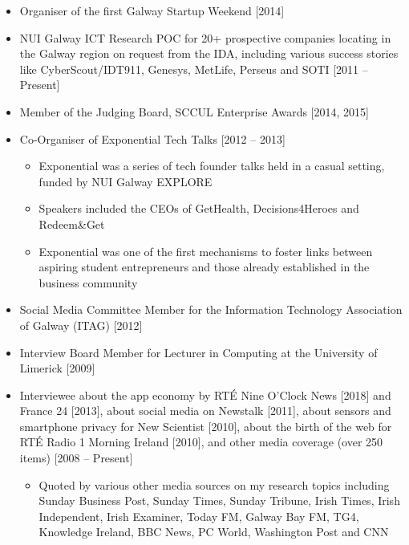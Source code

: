 \documentclass[10pt,a4paper]{res} %
\begin{document}
\begin{resume}
\begin{itemize}
\item Organiser of the first Galway Startup Weekend [2014]
\item NUI Galway ICT Research POC for 20+ prospective companies locating in the Galway region on request from the IDA, including various success stories like CyberScout/IDT911, Genesys, MetLife, Perseus and SOTI [2011 -- Present]
\item Member of the Judging Board, SCCUL Enterprise Awards [2014, 2015]
\item Co-Organiser of Exponential Tech Talks [2012 -- 2013]
\begin{itemize} \itemsep -2pt
\item Exponential was a series of tech founder talks held in a casual setting, funded by NUI Galway EXPLORE
\item Speakers included the CEOs of GetHealth, Decisions4Heroes and Redeem\&Get
\item Exponential was one of the first mechanisms to foster links between aspiring student entrepreneurs and those already established in the business community
\end{itemize}
\item Social Media Committee Member for the Information Technology Association of Galway (ITAG) [2012]
\item Interview Board Member for Lecturer in Computing at the University of Limerick [2009]
\item Interviewee about the app economy by RT\'{E} Nine O'Clock News [2018] and France 24 [2013], about social media on Newstalk [2011], about sensors and smartphone privacy for New Scientist [2010], about the birth of the web for RT\'{E} Radio 1 Morning Ireland [2010], and other media coverage (over 250 items) [2008 -- Present]
\begin{itemize} \itemsep -2pt
\item Quoted by various other media sources on my research topics including Sunday Business Post, Sunday Times, Sunday Tribune, Irish Times, Irish Independent, Irish Examiner, Today FM, Galway Bay FM, TG4, Knowledge Ireland, BBC News, PC World, Washington Post and CNN
\end{itemize}
\end{itemize}


\vspace{0.2in} %


\end{resume}
\end{document}
